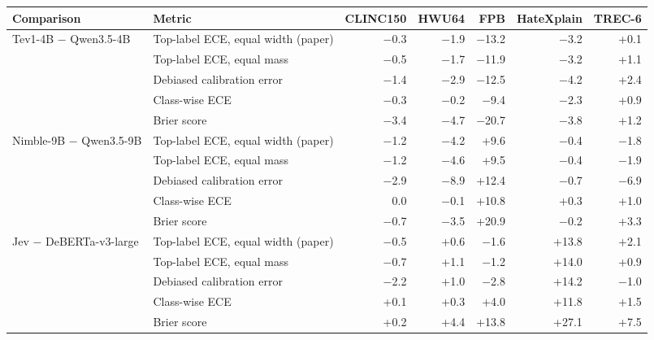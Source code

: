\begin{tabular}{llrrrrr}
\toprule
Comparison & Metric & CLINC150 & HWU64 & FPB & HateXplain & TREC-6 \\
\midrule
Tev1-4B $-$ Qwen3.5-4B & Top-label ECE, equal width (paper) & $-$0.3 & $-$1.9 & $-$13.2 & $-$3.2 & +0.1 \\
 & Top-label ECE, equal mass & $-$0.5 & $-$1.7 & $-$11.9 & $-$3.2 & +1.1 \\
 & Debiased calibration error & $-$1.4 & $-$2.9 & $-$12.5 & $-$4.2 & +2.4 \\
 & Class-wise ECE & $-$0.3 & $-$0.2 & $-$9.4 & $-$2.3 & +0.9 \\
 & Brier score & $-$3.4 & $-$4.7 & $-$20.7 & $-$3.8 & +1.2 \\
\midrule
Nimble-9B $-$ Qwen3.5-9B & Top-label ECE, equal width (paper) & $-$1.2 & $-$4.2 & +9.6 & $-$0.4 & $-$1.8 \\
 & Top-label ECE, equal mass & $-$1.2 & $-$4.6 & +9.5 & $-$0.4 & $-$1.9 \\
 & Debiased calibration error & $-$2.9 & $-$8.9 & +12.4 & $-$0.7 & $-$6.9 \\
 & Class-wise ECE & 0.0 & $-$0.1 & +10.8 & +0.3 & +1.0 \\
 & Brier score & $-$0.7 & $-$3.5 & +20.9 & $-$0.2 & +3.3 \\
\midrule
Jev $-$ DeBERTa-v3-large & Top-label ECE, equal width (paper) & $-$0.5 & +0.6 & $-$1.6 & +13.8 & +2.1 \\
 & Top-label ECE, equal mass & $-$0.7 & +1.1 & $-$1.2 & +14.0 & +0.9 \\
 & Debiased calibration error & $-$2.2 & +1.0 & $-$2.8 & +14.2 & $-$1.0 \\
 & Class-wise ECE & +0.1 & +0.3 & +4.0 & +11.8 & +1.5 \\
 & Brier score & +0.2 & +4.4 & +13.8 & +27.1 & +7.5 \\
\bottomrule
\end{tabular}

